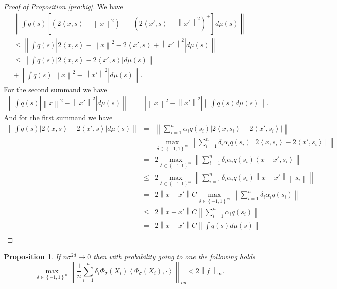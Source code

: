 \documentclass{article} %
\def\fm{{\Phi_\sigma}} %
\def\l{\left}
\def\r{\right}
\newtheorem{prop}{Proposition}
\theoremstyle{definition}
\begin{document}
\begin{proof}[Proof of Proposition \ref{pro:big}]
    We have
    \begin{eqnarray*}
        \l\| \int q(s) \l[\left(2 \l<x,s\r> - \l\|x\r\|^2  \right)^+ - \left( 2\l<x',s\r> - \l\|x'\r\|^2 \right)^+ \r] d\mu(s) \r\|\\
        \le \l\| \int q(s) \l|2 \l<x,s\r> - \l\|x\r\|^2  -  2\l<x',s\r> + \l\|x'\r\|^2 \r| d\mu(s) \r\|\\
        \le \l\| \int q(s) \l|2 \l<x,s\r> -  2\l<x',s\r> \r| d\mu(s) \r\|\\
        + \l\| \int q(s) \l|  \l\|x\r\|^2  - \l\|x'\r\|^2 \r| d\mu(s) \r\|.
    \end{eqnarray*}
    For the second summand we have
    \begin{eqnarray*}
        \l\| \int q(s) \l|  \l\|x\r\|^2  - \l\|x'\r\|^2 \r| d\mu(s) \r\|
        &=&\l|  \l\|x\r\|^2  - \l\|x'\r\|^2 \r|\l\| \int q(s)  d\mu(s) \r\|.
    \end{eqnarray*}
    And for the first summand we have
    \begin{eqnarray*}
         \l\| \int q(s) \l|2 \l<x,s\r> -  2\l<x',s\r> \r| d\mu(s) \r\|
         &=& \l\| \sum_{i=1}^n \alpha_i q(s_i) \l|2 \l<x,s_i\r> -  2\l<x',s_i\r> \r|  \r\|\\
         &=& \max_{\delta \in \left\{ -1,1 \right\}^m} \l\| \sum_{i=1}^n \delta_i \alpha_i q(s_i) \l[2 \l<x,s_i\r> -  2\l<x',s_i\r> \r]\r\| \\
         &=& 2\max_{\delta \in \left\{ -1,1 \right\}^m} \l\| \sum_{i=1}^n \delta_i \alpha_i q(s_i)  \l<x- x',s_i\r> \r\| \\
         &\le& 2\max_{\delta \in \left\{ -1,1 \right\}^m} \l\| \sum_{i=1}^n \delta_i \alpha_i q(s_i)  \l\|x- x'\r\|\l\|s_i\r\| \r\| \\
         &=& 2\l\|x- x'\r\|C\max_{\delta \in \left\{ -1,1 \right\}^m} \l\| \sum_{i=1}^n \delta_i \alpha_i q(s_i)   \r\| \\
         &\le& 2\l\|x- x'\r\|C \l\| \sum_{i=1}^n  \alpha_i q(s_i)   \r\| \\
         &=& 2\l\|x- x'\r\|C \l\| \int q(s) d\mu(s)   \r\| \\
    \end{eqnarray*}
\end{proof}
\begin{prop}\label{pro:tens}
    If $n\sigma^{2d} \to 0$ then with probability going to one the following holds
    \begin{equation*}
        \max_{\delta\in \left\{ -1,1 \right\}^ n} \l\| \frac{1}{n}\sum_{i=1}^n \delta_i \fm(X_i)\l<\fm(X_i),\cdot\r>\r\|_{op} < 2\l\|f\r\|_\infty.
    \end{equation*}
\end{prop}
\end{document}

